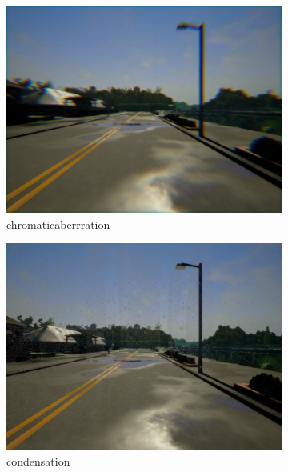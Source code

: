 \documentclass[14pt]{extarticle}
\begin{document}
\begin{figure}
\begin{subfigure}[b]{0.3\textwidth}
			 \includegraphics[scale=0.1]{./foto_sporcature/chromaticaberrration.png}
	         \caption{chromaticaberrration}
	         \label{fig:chromaticaberrration}
	     \end{subfigure}
	     \hfill
	     \begin{subfigure}[b]{0.3\textwidth}
	         \centering
			 \includegraphics[scale=0.1]{./foto_sporcature/condensation.png}
	         \caption{condensation}
	         \label{fig:condensation}
	     \end{subfigure}
	     \hfill
	     \begin{subfigure}[b]{0.3\textwidth}
	         \centering

\end{subfigure}
\end{figure}
\end{document}
